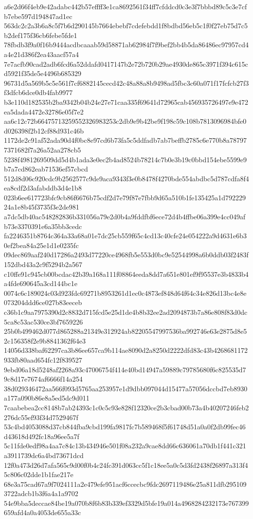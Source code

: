 {a6e2d66f4eb9e42adabc442b57effff3e1ca8692561f34ff7cfddcd0c3e3f7bbbd89c5c3e7cfb7ebe597d194847ad1ec
563dc2c2a3b6a8c5f7b6d290145b7664ebebf7cdefebdd1f8bdbd56eb5c1f0f27eb75d7c5b2def175f36cb6febe5fde1
78fbdb3f9a0f16b9444acdbcaaab59d58871ab62984f7f9bef2bb4b5da86486ec97957cd4a4e21d386f2ea43aacf57a4
7e7acfb90cad2adb6fcd6a52ddafd0417147b2e72b720b29ae4930de865c3971f394c615cd5921f35de5e4496b685329
96731d5a569b5c5e561f7cf6882145cecd42c48a88a8b9498ad5fbc3c60a071f17fcfcb27f3f3dfcb6dce0db4fab9977
b3e110d182535b2ba9342b04b24e27e71caa335f69641d72965cab456935726497e9e472ea5dada4472e32786e05f7e2
aa6c12c72b66475713259552326983253c2db9e9b42be9f198c59c108b7813096984bfe0d026398f2b12cf88d931c46b
1172de2c91af52ada90d4f0bc8e97cd6b73fa5c5ddfadb7ab7beffb2785c6e770b8a787977371682f7a26a52aa278cb5
5238f4981269509dd5d4b1ada3e0ec2b4ad8524b78214c7b0e3b19c0bbd154ebe5599e9b7a7cd862eab71536ef57cbcd
512d8d06c920cdc9b2562577c9de9aca9343f3e0b8478f4270bde554abdbc5d787cdfa8f4ea8cdf2d3afabddb3d4e1b8
023b6ee617723bfc9cb86f6676b75cdf2d7e79f87e7fbb9d65a510b1fe135425a1d79222924a1e8b45f3735f3e2de981
a7dc5db40ac548282836b331056a79e2d0b4a9fddfbf6ece72d4b4ffbe06a399e4cc049afb73e3370391e6a35bb3cedc
fa2246351b8764c364a33a68a01e7dc25cb559f65c4cd13c40cfe24e054222a9d4631e6b30ef2bea84a25e1d1e0235fc
09dec869aaf240d17286a2493d77220ce4968fb5e553d0bc9e52544998a6b0ddb03f2483f152dbd43a2c9f5294b2a567
c10ffe91c945cb00bcdac42b39a168a111f08864eeda8dd7a651e801ef9f95537e3b4833b4a4fde690645a3cd144bc1e
0074c6c189024c03d923fdc69271b8953261d1ec0c4873ef848d64f64c34e826d13bc4e8e073204ddd6ce027b83eeceb
c36b1c9aa7975390d2c8832d715fcd5e25d1de4b8b32ee2ad2094873b7a86e808f83d0dc5ca8c53ac530ce3bf7659226
25b0b499462d077d865288a21349e312924ab82205547997536ba992746e63e2875d8e52c156358f2e9b8841362f64e3
14056d338baf62297ca3b86ee657ca9b114ae8090d2a8250d2222dfd83c43b4268681172933fb80aad654fc12f839527
9ebd06a18d5248af2268a93c47006754f414e40bd14947a59889c79785680f6c825535d79c8d17e7674af6666f14a254
38d029346472aa566f093d5765aa253957e1d9dbb097044d15477a57056dccbd7eb8930a177a090b86e8a5ed5dc9d011
7caabebea2cc8148b7ab24393c1c0c5c93e828f12320ce2b3cbad00b73a4b40207246feb2276dc55ef93f34d7529467f
53c4bd4053088d37cb844fba9cbd199fa9817fc7b589468f5f61748d51a0a0f2db99fec46d43618d492fc18a96ee5a7f
5c11fde0edf98a4aa7c84c13b434946e501f08a232a9cae8dd66c636061a70db1f441c321a3911739dc6a4bd73671dcd
12f0a473d26d7afa565c9d00f0b4c24fc391d063cc5f1c18ee5a0c5d3fd2438f26897a313f45c806c02dde1b1fae217e
68e3a75cad67a9f7024111a2e479efe951acf6ccecbc9fdc2697119486e25a811dfb2951093722adcb1b3f6a4a1a9702
54e9bba5deccae84be19a070b8f6b83b339ef3329d5bfe19a014a4968284232173e767399659afd4a0a4053de655a33c
}
